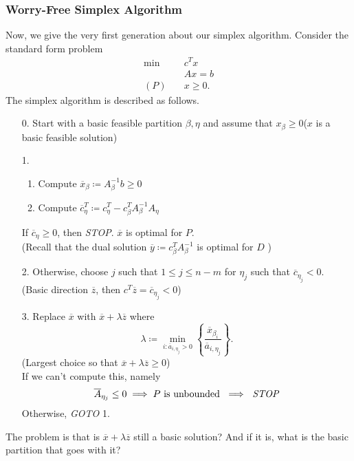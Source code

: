 \subsubsection{Worry-Free Simplex Algorithm}
Now, we give the very first generation about our simplex algorithm. Consider the standard form problem
\[
	\begin{alignedat}{5}
		\min~&c^{T}x\\
		&Ax = b \\
		(P)\quad&x\geq  0.
	\end{alignedat}
\]
The simplex algorithm is described as follows.
\begin{enumerate}
	\item[0.] Start with a basic feasible partition \(\beta, \eta\) and assume that \(x_{\beta}\geq 0\)(\(x\) is a basic feasible solution)
	\item[1.] \begin{enumerate}
			\item Compute \(\overline{x}_{\beta} \coloneqq A^{-1}_{\beta} b \geq 0\)
			\item Compute \(\overline{c}_{\eta}^{T} \coloneqq c_{\eta}^{T} - c_{\beta}^{T} A^{-1}_{\beta} A_{\eta}\)
		\end{enumerate}
		If \(\overline{c}_{\eta} \geq 0\), then \emph{STOP}. \(\overline{x}\) is optimal for \(P\). \\(Recall that the dual solution \(\overline{y}\coloneqq c_{\beta}^{T}A^{-1}_{\beta}\) is optimal for \(D\) )
	\item[2.] Otherwise, choose \(j\) such that \(1\leq j\leq n-m\) for \(\eta_j\) such that \(\overline{c}_{\eta_j} < 0\). (Basic direction \(\overline{z}\), then \(c^{T}\overline{z} = \overline{c}_{\eta_{j}}<0\))
	\item[3.] Replace \(\overline{x}\) with \(\overline{x} + \lambda \overline{z}\) where
		\[
			\lambda \coloneqq \min_{i:\overline{a}_{i, \eta_{j}}>0}\left\{ \frac{\overline{x}_{\beta_{i}}}{\overline{a}_{i, \eta_{j}}} \right\}.
		\]
		(Largest choice so that \(\overline{x} + \lambda \overline{z} \geq 0\))\\
		If we can't compute this, namely
		\[
			\overline{A}_{\eta_{j}} \leq 0\implies P \text{ is unbounded }\implies \text{ \emph{STOP}}
		\]
		Otherwise, \emph{GOTO} 1.
\end{enumerate}

\begin{problem}
The problem is that is \(\overline{x}+\lambda \overline{z}\) still a basic solution? And if it is, what is the basic partition that goes with it?
\end{problem}

